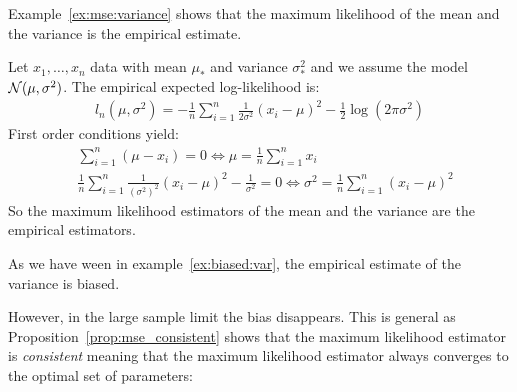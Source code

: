 Example~\ref{ex:mse:variance} shows that the maximum likelihood of the mean and the variance is the empirical estimate. 
\begin{example}
  \label{ex:mse:variance}
  Let $x_1, \dots, x_n$ data with mean $\mu_*$ and variance $\sigma_*^2$ and we
  assume the model $\mathcal{N}(\mu, \sigma^2)$.
  The empirical expected log-likelihood is:
  \begin{align}
    l_n(\mu, \sigma^2) = -\frac1{n} \sum_{i=1}^n \frac1{2 \sigma^2}(x_i - \mu)^2 - \frac12 \log(2\pi \sigma^2)
  \end{align}
  First order conditions
  yield:
  \begin{align}
    &\sum_{i=1}^n (\mu - x_i) = 0 \iff \mu = \frac1{n} \sum_{i=1}^n x_i \\
    &\frac1{n} \sum_{i=1}^n \frac1{(\sigma^2)^2}(x_i - \mu)^2 - \frac1{\sigma^2} = 0 \iff \sigma^2 = \frac1{n} \sum_{i=1}^n(x_i - \mu)^2
  \end{align}
  So the maximum likelihood estimators of the mean and the variance are the
  empirical estimators.
\end{example}
As we have ween in example~\ref{ex:biased:var}, the empirical estimate of the variance is biased.

However, in the large sample limit the bias disappears. This is general as
Proposition~\ref{prop:mse_consistent} shows that the maximum likelihood
estimator is \emph{consistent} meaning that the maximum likelihood estimator
always converges to the optimal set of parameters:

